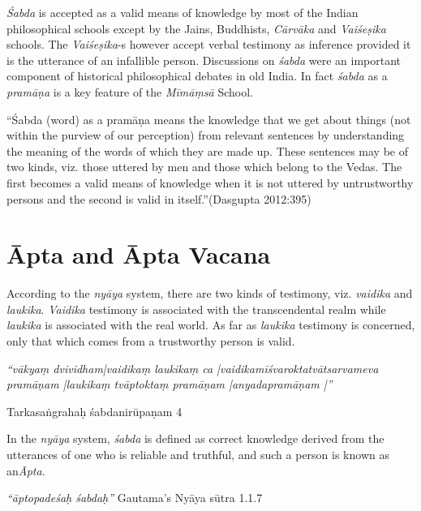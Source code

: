 \textit{Śabda} is accepted as a valid means of knowledge by most of the Indian philosophical schools except by the Jains, Buddhists, \textit{Cārvāka} and \textit{Vaiśeṣika} schools. The \textit{Vaiśeṣika}-s however accept verbal testimony as inference provided it is the utterance of an infallible person. Discussions on \textit{śabda} were an important component of historical philosophical debates in old India. In fact \textit{śabda} as a \textit{pramāṇa} is a key feature of the \textit{Mīmāṃsā} School.

\begin{myquote}
“Śabda (word) as a pramāṇa means the knowledge that we get about things (not within the purview of our perception) from relevant sentences by understanding the meaning of the words of which they are made up. These sentences may be of two kinds, viz. those uttered by men and those which belong to the Vedas. The first becomes a valid means of knowledge when it is not uttered by untrustworthy persons and the second is valid in itself.”(Dasgupta 2012:395)
\end{myquote}


\section*{Āpta and Āpta Vacana}

According to the \textit{nyāya} system, there are two kinds of testimony, viz. \textit{vaidika} and \textit{laukika}. \textit{Vaidika} testimony is associated with the transcendental realm while \textit{laukika} is associated with the real world. As far as \textit{laukika} testimony is concerned, only that which comes from a trustworthy person is valid.

\newpage

\begin{myquote}
\textit{“vākyaṃ dvividham|vaidikaṃ laukikaṃ ca |vaidikamīśvaroktatvātsarvameva pramāṇam |laukikaṃ tvāptoktaṃ pramāṇam |anyadapramāṇam |”}
\end{myquote}

\begin{center}
Tarkasaṅgrahaḥ śabdanirūpaṇam 4
\end{center}

In the \textit{nyāya} system, \textit{śabda} is defined as correct knowledge derived from the utterances of one who is reliable and truthful, and such a person is known as an\textit{Āpta}.

\begin{myquote}
\textit{“āptopadeśaḥ śabdaḥ”} Gautama’s Nyāya sūtra 1.1.7
\end{myquote}

